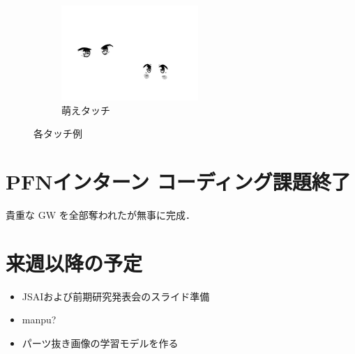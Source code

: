 \documentclass[onecolumn]{ujarticle}     %
\begin{document}
\begin{figure}[t]
\begin{subfigure}{0.49\columnwidth}
			\includegraphics[width=1.2\columnwidth]{eye_moe.png}
			\caption{萌えタッチ}
			\label{fig:moe}
		\end{subfigure}
		\caption{各タッチ例}
		\label{fig:touch_example}
	\end{figure}

	\section{PFNインターン コーディング課題終了}
	貴重な GW を全部奪われたが無事に完成．

	\section{来週以降の予定}
	\begin{itemize}
		\item JSAIおよび前期研究発表会のスライド準備
		\item manpu?
		\item パーツ抜き画像の学習モデルを作る
	\end{itemize}
	
\end{document}
